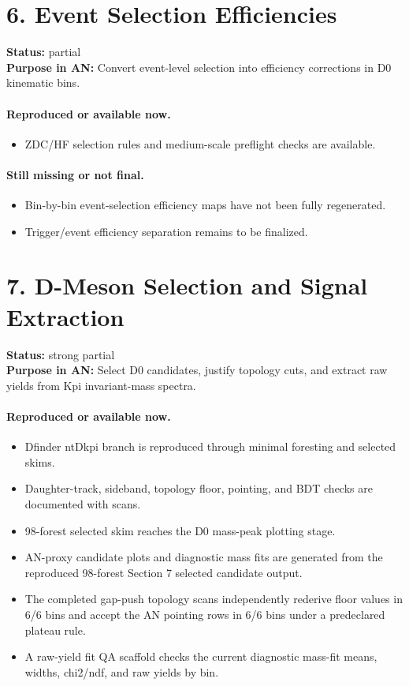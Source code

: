 \documentclass[11pt]{article}
\begin{document}
\section*{6. Event Selection Efficiencies}
\textbf{Status:} partial\\
\textbf{Purpose in AN:} Convert event-level selection into efficiency corrections in D0 kinematic bins.
\paragraph{Reproduced or available now.}
\begin{itemize}
\item ZDC/HF selection rules and medium-scale preflight checks are available.
\end{itemize}
\paragraph{Still missing or not final.}
\begin{itemize}
\item Bin-by-bin event-selection efficiency maps have not been fully regenerated.
\item Trigger/event efficiency separation remains to be finalized.
\end{itemize}
\section*{7. D-Meson Selection and Signal Extraction}
\textbf{Status:} strong partial\\
\textbf{Purpose in AN:} Select D0 candidates, justify topology cuts, and extract raw yields from Kpi invariant-mass spectra.
\paragraph{Reproduced or available now.}
\begin{itemize}
\item Dfinder ntDkpi branch is reproduced through minimal foresting and selected skims.
\item Daughter-track, sideband, topology floor, pointing, and BDT checks are documented with scans.
\item 98-forest selected skim reaches the D0 mass-peak plotting stage.
\item AN-proxy candidate plots and diagnostic mass fits are generated from the reproduced 98-forest Section 7 selected candidate output.
\item The completed gap-push topology scans independently rederive floor values in 6/6 bins and accept the AN pointing rows in 6/6 bins under a predeclared plateau rule.
\item A raw-yield fit QA scaffold checks the current diagnostic mass-fit means, widths, chi2/ndf, and raw yields by bin.
\end{itemize}
\end{document}

